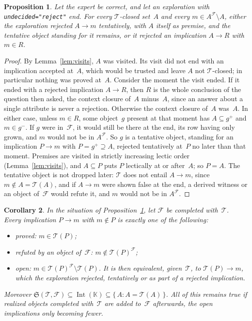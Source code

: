 \documentclass[11pt,a4paper]{article}
\newtheorem{proposition}{Proposition}
\newtheorem{corollary}[proposition]{Corollary}
\theoremstyle{definition}
\theoremstyle{remark}
\newcommand{\code}[1]{\texttt{#1}}
\newcommand{\pos}{^{+}}
\newcommand{\nega}{^{-}}
\newcommand{\Int}{\operatorname{Int}}
\begin{document}
\begin{proposition}\label{prop:reject}
Let the expert be correct, and let an exploration with \code{undecided="reject"} end. For every $\mathcal{T}$-closed set~$A$ and every $m \in A^{\mathcal{F}} \setminus A$, either the exploration rejected $A \to m$ tentatively, with $A$ itself as premise, and the tentative object standing for it remains, or it rejected an implication $A \to R$ with $m \in R$.
\end{proposition}

\begin{proof}
By Lemma~\ref{lem:visits}, $A$ was visited. Its visit did not end with an implication accepted at~$A$, which would be trusted and leave $A$ not $\mathcal{T}$-closed; in particular nothing was proved at~$A$. Consider the moment the visit ended. If it ended with a rejected implication $A \to R$, then $R$ is the whole conclusion of the question then asked, the context closure of~$A$ minus~$A$, since an answer about a single attribute is never a rejection. Otherwise the context closure of~$A$ was~$A$. In either case, unless $m \in R$, some object~$g$ present at that moment has $A \subseteq g\pos$ and $m \in g\nega$. If $g$ were in~$\mathcal{F}$, it would still be there at the end, its row having only grown, and $m$ would not be in $A^{\mathcal{F}}$. So $g$ is a tentative object, standing for an implication $P \to m$ with $P = g\pos \supseteq A$, rejected tentatively at~$P$ no later than that moment. Premises are visited in strictly increasing lectic order (Lemma~\ref{lem:visits}), and $A \subseteq P$ puts $P$ lectically at or after~$A$; so $P = A$. The tentative object is not dropped later: $\mathcal{T}$ does not entail $A \to m$, since $m \notin A = \mathcal{T}(A)$, and if $A \to m$ were shown false at the end, a derived witness or an object of~$\mathcal{F}$ would refute it, and $m$ would not be in $A^{\mathcal{F}}$.
\end{proof}

\begin{corollary}\label{cor:reject}
In the situation of Proposition~\ref{prop:reject}, let $\mathcal{F}$ be completed with~$\mathcal{T}$. Every implication $P \to m$ with $m \notin P$ is exactly one of the following:
\begin{itemize}
  \item \emph{proved}: $m \in \mathcal{T}(P)$;
  \item \emph{refuted} by an object of~$\mathcal{F}$: $m \notin \mathcal{T}(P)^{\mathcal{F}}$;
  \item \emph{open}: $m \in \mathcal{T}(P)^{\mathcal{F}} \setminus \mathcal{T}(P)$. It is then equivalent, given~$\mathcal{T}$, to $\mathcal{T}(P) \to m$, which the exploration rejected, tentatively or as part of a rejected implication.
\end{itemize}
Moreover $\mathfrak{S}(\mathcal{T}, \mathcal{F}) \subseteq \Int(\mathbb{K}) \subseteq \{\, A : A = \mathcal{T}(A) \,\}$. All of this remains true if realized objects completed with~$\mathcal{T}$ are added to~$\mathcal{F}$ afterwards, the open implications only becoming fewer.
\end{corollary}
\end{document}
